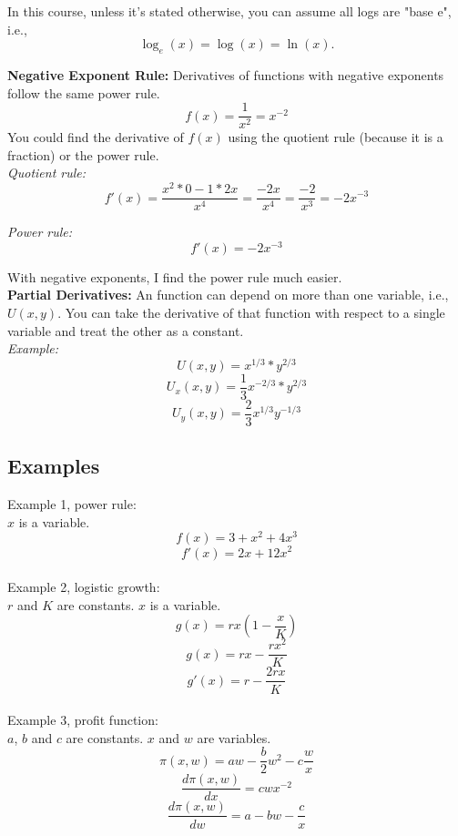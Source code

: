 \documentclass{article}
\begin{document}
In this course, unless it's stated otherwise, you can assume all logs are "base e", i.e., 
$$\log_e(x) = \log(x) = \ln(x).$$ 


\textbf{Negative Exponent Rule:} Derivatives of functions with negative exponents follow the same power rule. \\
$$f(x) = \frac{1}{x^2} = x^{-2}$$
You could find the derivative of $f(x)$ using the quotient rule (because it is a fraction) or the power rule. \\

\textit{Quotient rule:} 
$$f'(x) = \frac{x^2 * 0 - 1*2x}{x^4} = \frac{-2x}{x^4} = \frac{-2}{x^3} = -2x^{-3}$$

\textit{Power rule: }
$$f'(x) = -2x^{-3}$$

With negative exponents, I find the power rule much easier. \\



\textbf{Partial Derivatives:} An function can depend on more than one variable, i.e., $U(x,y)$. You can take the derivative of that function with respect to a single variable and treat the other as a constant.\\

\textit{Example:} 
$$U(x,y) = x^{1/3} * y^{2/3}$$
$$U_x(x,y) = \frac{1}{3}x^{-2/3}*y^{2/3}$$
$$U_y(x,y)= \frac{2}{3}x^{1/3}y^{-1/3}$$



\subsection{Examples}

Example 1, power rule:\\ 
$x$ is a variable. \\
$$f(x) = 3 + x^2 + 4x^3$$
$$f'(x) = 2x + 12x^2$$\\

Example 2, logistic growth: \\
$r$ and $K$ are constants. $x$ is a variable. \\
$$g(x) = rx(1 - \frac{x}{K})$$
$$g(x) = rx - \frac{rx^2}{K} $$
$$g'(x) = r - \frac{2rx}{K}$$ \\

Example 3, profit function: \\
$a$, $b$ and $c$ are constants. $x$ and $w$ are variables. \\
$$\pi(x,w) = aw - \frac{b}{2}w^2 - c \frac{w}{x}$$
$$\frac{d \pi(x,w)}{dx} = c w x^{-2} $$
$$\frac{d \pi(x,w)}{d w} = a - bw - \frac{c}{x}$$
\end{document}
